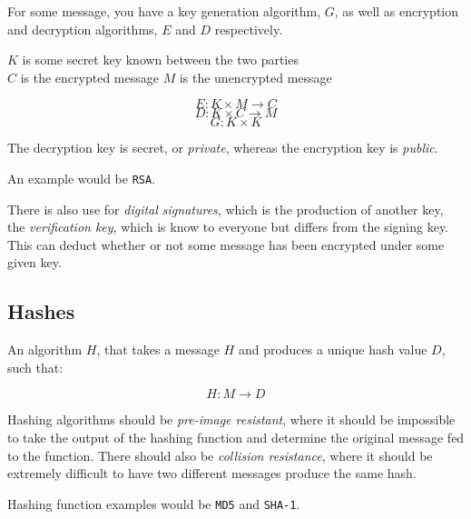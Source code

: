 \documentclass{article}
\begin{document}
For some message, you have a key generation algorithm, $G$, as well as encryption and decryption algorithms, $E$ and $D$ respectively.

\vspace{.5cm}
\begin{center}
  $K$ is some secret key known between the two parties\\
  $C$ is the encrypted message
  $M$ is the unencrypted message
\end{center}

\[ E : K \times M \rightarrow C\]
\[ D : K \times C \rightarrow M\]
\[ G : K \times K \]

The decryption key is secret, or \textit{private}, whereas the encryption key is \textit{public}.

An example would be \texttt{RSA}.
 
There is also use for \textit{digital signatures}, which is the production of another key, the \textit{verification key}, which is know to everyone but differs from the signing key. This can deduct whether or not some message has been encrypted under some given key.

\subsection{Hashes}

An algorithm $H$, that takes a message $H$ and produces a unique hash value $D$, such that:

\[ H : M \rightarrow D\]

Hashing algorithms should be \textit{pre-image resistant}, where it should be impossible to take the output of the hashing function and determine the original message fed to the function. There should also be \textit{collision resistance}, where it should be extremely difficult to have two different messages produce the same hash.

Hashing function examples would be \texttt{MD5} and \texttt{SHA-1}.
\end{document}

